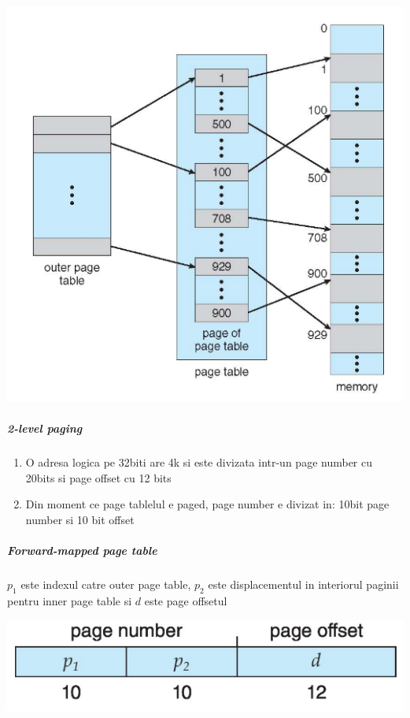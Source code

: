 \documentclass{article}
\begin{document}
\begin{center}
    \includegraphics[scale=0.3]{21_hpt.png}
\end{center}

\subparagraph*{2-level paging}
\begin{enumerate}
    \item O adresa logica pe 32biti are 4k si este divizata intr-un page number cu 20bits si page offset cu 12 bits
    \item Din moment ce page tablelul e paged, page number e divizat in: 10bit page number si 10 bit offset
\end{enumerate}
\subparagraph*{Forward-mapped page table} $p_1$ este indexul catre outer page table, $p_2$ este displacementul in interiorul paginii pentru inner page table si $d$ este page offsetul

\begin{center}
    \includegraphics[scale=0.3]{22-fmpt.png}
\end{center}
\end{document}
